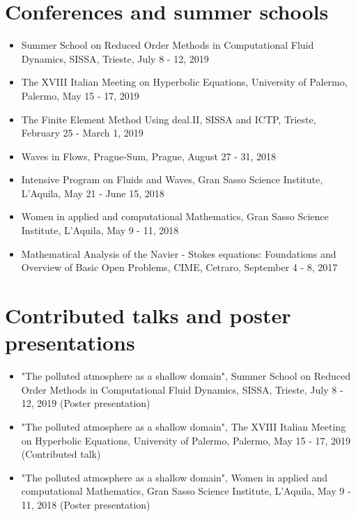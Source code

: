 \documentclass[11pt]{article}
\begin{document}
\newpage

\section{Conferences and summer schools}

\begin{itemize}
  \item Summer School on Reduced Order Methods in Computational Fluid Dynamics, SISSA, Trieste, July 8 - 12, 2019
  \item The XVIII Italian Meeting on Hyperbolic Equations, University of Palermo, Palermo, May 15 - 17, 2019
  \item The Finite Element Method Using deal.II, SISSA and ICTP, Trieste, February 25 - March 1, 2019
  \item Waves in Flows, Prague-Sum, Prague, August 27 - 31, 2018
  \item Intensive Program on Fluids and Waves, Gran Sasso Science Institute, L'Aquila, May 21 - June 15, 2018
  \item Women in applied and computational Mathematics, Gran Sasso Science Institute, L'Aquila, May 9 - 11, 2018
  \item Mathematical Analysis of the Navier - Stokes equations: Foundations and Overview of Basic Open Problems, CIME, Cetraro, September 4 - 8, 2017
\end{itemize}

\newpage

\section{Contributed talks and poster presentations}

\begin{itemize}
  \item "The polluted atmosphere as a shallow domain", Summer School on Reduced Order Methods in Computational Fluid Dynamics, SISSA, Trieste, July 8 - 12, 2019 (Poster presentation)
  \item "The polluted atmosphere as a shallow domain", The XVIII Italian Meeting on Hyperbolic Equations, University of Palermo, Palermo, May 15 - 17, 2019 (Contributed talk)
  \item "The polluted atmosphere as a shallow domain", Women in applied and computational Mathematics, Gran Sasso Science Institute, L'Aquila, May 9 - 11, 2018 (Poster presentation)
\end{itemize}
\end{document}
